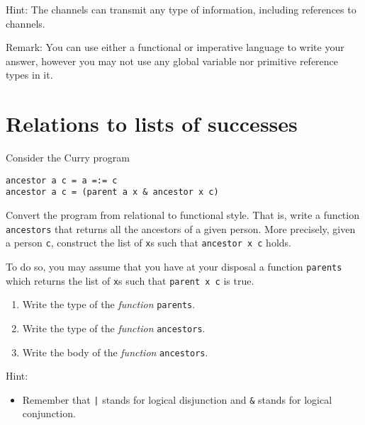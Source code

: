 \documentclass{article}
\newcommand{\answer}[1]{}
\begin{document}
Hint: The channels can transmit any type of information, including
references to channels.

Remark: You can use either a functional or imperative language to
write your answer, however you may not use any global variable nor
primitive reference types in it.

\answer{
\begin{verbatim}
data Command a = Get (Chan a) | Set a
type Variable a = Chan (Command a)

handler :: Variable a -> a -> IO ()
handler v a = do
  command <- readChan v
  case command of
    Set a' -> handler v a'
    Get c -> do
      writeChan c a
      handler v a

newVariable :: a -> IO (Variable a)
newVariable a = do
  c <- newChan
  forkIO (handler c a)
  return c

get :: Variable a -> IO a
get v = do
  c <- newChan
  writeChan v (Get c)
  readChan c

set :: Variable a -> a -> IO ()
set v a = do
  writeChan v (Set a)
\end{verbatim}
}

\newpage
\section{Relations to lists of successes}

Consider the Curry program
\begin{verbatim}
ancestor a c = a =:= c
ancestor a c = (parent a x & ancestor x c) 
\end{verbatim}



Convert the program from relational to functional style. That is,
write a function \texttt{ancestors} that returns all the ancestors of
a given person.  More precisely, given a person \texttt{c}, construct the
list of \texttt{x}s such that \texttt{ancestor x c} holds.

To do so, you may assume that you have at your disposal a function
\texttt{parents} which returns the list of \texttt{x}s such that
\texttt{parent x c} is true.

\begin{enumerate}
\item Write the type of the \emph{function} \texttt{parents}.
\item Write the type of the \emph{function} \texttt{ancestors}.
\item Write the body of the \emph{function} \texttt{ancestors}.
\end{enumerate}


Hint:
\begin{itemize}
\item Remember that \texttt{|} stands for logical disjunction and
  \texttt{\&} stands for logical conjunction.
\end{itemize}
\end{document}
